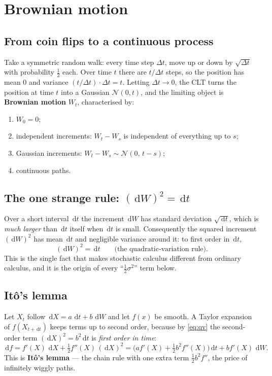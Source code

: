 \documentclass[11pt,a4paper]{article}
\newcommand{\dd}{\,\mathrm{d}}
\newcommand{\N}{\mathcal{N}}
\begin{document}
\section{Brownian motion}
\label{sec:bm}

\subsection{From coin flips to a continuous process}
Take a symmetric random walk: every time step $\Delta t$, move up or down by
$\sqrt{\Delta t}$ with probability $\tfrac12$ each. Over time $t$ there are
$t/\Delta t$ steps, so the position has mean 0 and variance
$(t/\Delta t)\cdot\Delta t=t$. Letting $\Delta t\to0$, the CLT turns the position
at time $t$ into a Gaussian $\N(0,t)$, and the limiting object is
\textbf{Brownian motion} $W_t$, characterised by:
\begin{enumerate}[itemsep=1pt]
\item $W_0=0$;
\item independent increments: $W_t-W_s$ is independent of everything up to $s$;
\item Gaussian increments: $W_t-W_s\sim\N(0,\,t-s)$;
\item continuous paths.
\end{enumerate}

\subsection{The one strange rule: \texorpdfstring{$(\dd W)^2=\dd t$}{(dW)\texttwosuperior{} = dt}}
Over a short interval $\dd t$ the increment $\dd W$ has standard deviation
$\sqrt{\dd t}$, which is \emph{much larger} than $\dd t$ itself when $\dd t$ is
small. Consequently the squared increment $(\dd W)^2$ has mean $\dd t$ and
negligible variance around it: to first order in $\dd t$,
\begin{equation}
(\dd W)^2 = \dd t \qquad\text{(the quadratic-variation rule).}
\label{eq:qv}
\end{equation}
This is the single fact that makes stochastic calculus different from ordinary
calculus, and it is the origin of every ``$\tfrac12\sigma^2$'' term below.

\subsection{It\^o's lemma}
Let $X_t$ follow $\dd X=a\,\dd t+b\,\dd W$ and let $f(x)$ be smooth. A Taylor
expansion of $f(X_{t+\dd t})$ keeps terms up to second order, because by
\eqref{eq:qv} the second-order term $(\dd X)^2=b^2\dd t$ is \emph{first order in
time}:
\begin{equation}
\dd f
= f'(X)\,\dd X+\tfrac12 f''(X)\,(\dd X)^2
= \Big(a f'(X)+\tfrac12 b^2 f''(X)\Big)\dd t+b f'(X)\,\dd W .
\label{eq:ito}
\end{equation}
This is \textbf{It\^o's lemma} --- the chain rule with one extra term
$\tfrac12 b^2 f''$, the price of infinitely wiggly paths.
\end{document}
